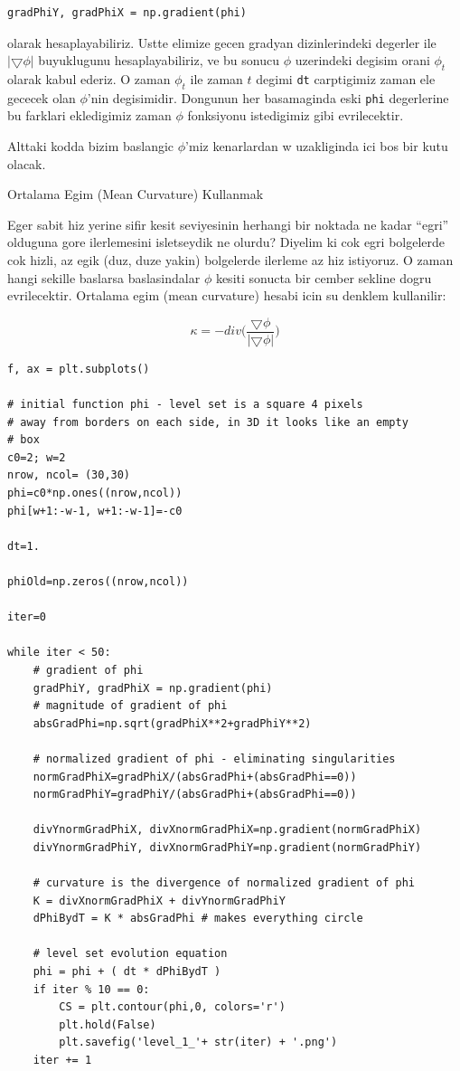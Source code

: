 \documentclass[12pt,fleqn]{article}\usepackage{../common}
\begin{document}
\begin{verbatim}
gradPhiY, gradPhiX = np.gradient(phi)
\end{verbatim}

olarak hesaplayabiliriz. Ustte elimize gecen gradyan dizinlerindeki
degerler ile $|\bigtriangledown\phi|$ buyuklugunu hesaplayabiliriz, ve bu
sonucu $\phi$ uzerindeki degisim orani $\phi_t$ olarak kabul ederiz. O
zaman $\phi_t$ ile zaman $t$ degimi \verb!dt! carptigimiz zaman ele gececek
olan $\phi$'nin degisimidir. Dongunun her basamaginda eski \verb!phi!
degerlerine bu farklari ekledigimiz zaman $\phi$ fonksiyonu istedigimiz
gibi evrilecektir.

Alttaki kodda bizim baslangic $\phi$'miz kenarlardan w uzakliginda ici bos
bir kutu olacak. 

Ortalama Egim (Mean Curvature) Kullanmak

Eger sabit hiz yerine sifir kesit seviyesinin herhangi bir noktada ne kadar
``egri'' olduguna gore ilerlemesini isletseydik ne olurdu?  Diyelim ki cok
egri bolgelerde cok hizli, az egik (duz, duze yakin) bolgelerde ilerleme az
hiz istiyoruz. O zaman hangi sekille baslarsa baslasindalar $\phi$ kesiti
sonucta bir cember sekline dogru evrilecektir. Ortalama egim (mean
curvature) hesabi icin su denklem kullanilir:

$$ \kappa = -div \bigg( \frac{\bigtriangledown \phi}
{|\bigtriangledown \phi| } \bigg) $$

\begin{verbatim}
f, ax = plt.subplots()

# initial function phi - level set is a square 4 pixels
# away from borders on each side, in 3D it looks like an empty
# box
c0=2; w=2
nrow, ncol= (30,30)
phi=c0*np.ones((nrow,ncol))
phi[w+1:-w-1, w+1:-w-1]=-c0

dt=1.

phiOld=np.zeros((nrow,ncol))

iter=0

while iter < 50:
    # gradient of phi
    gradPhiY, gradPhiX = np.gradient(phi)
    # magnitude of gradient of phi
    absGradPhi=np.sqrt(gradPhiX**2+gradPhiY**2)                               
    
    # normalized gradient of phi - eliminating singularities
    normGradPhiX=gradPhiX/(absGradPhi+(absGradPhi==0))
    normGradPhiY=gradPhiY/(absGradPhi+(absGradPhi==0))
    
    divYnormGradPhiX, divXnormGradPhiX=np.gradient(normGradPhiX)
    divYnormGradPhiY, divXnormGradPhiY=np.gradient(normGradPhiY)
                           
    # curvature is the divergence of normalized gradient of phi
    K = divXnormGradPhiX + divYnormGradPhiY
    dPhiBydT = K * absGradPhi # makes everything circle
    
    # level set evolution equation    
    phi = phi + ( dt * dPhiBydT )
    if iter % 10 == 0: 
        CS = plt.contour(phi,0, colors='r')
        plt.hold(False)
        plt.savefig('level_1_'+ str(iter) + '.png')
    iter += 1
\end{verbatim}
\end{document}
